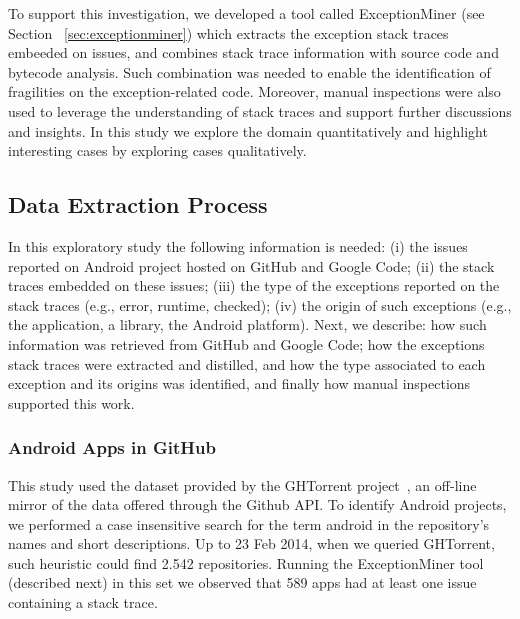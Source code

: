 \documentclass[conference]{IEEEtran}
\begin{document}
To support this investigation, we developed a tool called ExceptionMiner (see Section ~\ref{sec:exceptionminer})
which extracts the exception stack traces embeeded on issues, 
and combines stack trace information with source code and bytecode 
analysis. Such combination was needed to enable the identification of 
fragilities on the exception-related code.
Moreover, manual inspections were also used to leverage
 the understanding of stack traces and support further discussions and insights.
In this study we explore the domain quantitatively and highlight interesting cases by 
exploring cases qualitatively.  

\subsection{Data Extraction Process}
\label{sec:miningproc}

In this exploratory study the following information is needed: (i) the issues reported on Android project hosted on 
GitHub and Google Code; (ii) the stack traces embedded on these issues; (iii) the type of the exceptions
 reported on the stack traces (e.g., error, runtime, checked); (iv) the origin of such exceptions 
(e.g., the application, a library, the Android platform). Next, we describe: how such information 
was retrieved from GitHub and Google Code; how the exceptions stack traces were extracted and distilled,
 and how the type associated to each exception and its origins was identified, and finally how manual
inspections supported this work.


\subsubsection{Android Apps in GitHub}
\label{sec:git}


This study used the dataset provided by the GHTorrent project~\cite{Gousi13}, 
an off-line mirror of the data  offered through the Github API.  
To identify Android projects, we performed a case insensitive search for the
term \textsf{android} in the repository's names and short descriptions.  
Up to 23 Feb 2014,  when we queried GHTorrent, such heuristic could
 find 2.542 repositories. Running the ExceptionMiner tool (described next)
 in this set we observed that 589 apps had at least one issue containing a stack trace.
\end{document}
